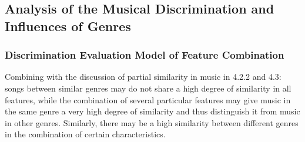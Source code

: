 \documentclass[12pt]{article}  %
\begin{document}
%
\vspace{-0.6cm}
\subsection{Analysis of the Musical Discrimination and Influences of Genres}
\vspace{-0.3cm}
\subsubsection{Discrimination Evaluation Model of Feature Combination}
\vspace{-0.3cm}
Combining with the discussion of partial similarity in music in 4.2.2 and 4.3: songs between similar genres may do not share a high degree of similarity in all features, while the combination of several particular features may give music in the same genre a very high degree of similarity and thus distinguish it from music in other genres. Similarly, there may be a high similarity between different genres in the combination of certain characteristics.
\end{document}
